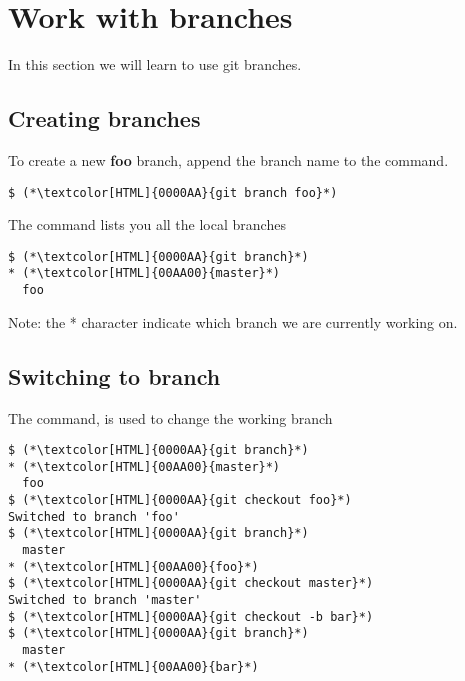 \section{Work with branches}
\begin{frame}[fragile]
    \slidetitle
In this section we will learn to use git branches.

\end{frame}

\subsection{Creating branches}
\begin{frame}[fragile]
    \subslidetitle

To create a new \textbf{foo} branch, append the branch name to the command.
\begin{lstlisting}
$ (*\textcolor[HTML]{0000AA}{git branch foo}*)
\end{lstlisting}

The  command lists you all the local branches
\begin{lstlisting}
$ (*\textcolor[HTML]{0000AA}{git branch}*)
* (*\textcolor[HTML]{00AA00}{master}*)
  foo
\end{lstlisting}

Note: the * character indicate which branch we are currently working on.
\end{frame}

\subsection{Switching to branch}
\begin{frame}[fragile]
    \subslidetitle
The  command, is used to change the working branch
\begin{lstlisting}
$ (*\textcolor[HTML]{0000AA}{git branch}*)
* (*\textcolor[HTML]{00AA00}{master}*)
  foo
$ (*\textcolor[HTML]{0000AA}{git checkout foo}*)
Switched to branch 'foo'
$ (*\textcolor[HTML]{0000AA}{git branch}*)
  master
* (*\textcolor[HTML]{00AA00}{foo}*)
$ (*\textcolor[HTML]{0000AA}{git checkout master}*)
Switched to branch 'master'
$ (*\textcolor[HTML]{0000AA}{git checkout -b bar}*)
$ (*\textcolor[HTML]{0000AA}{git branch}*)
  master
* (*\textcolor[HTML]{00AA00}{bar}*)
\end{lstlisting}
\end{frame}


